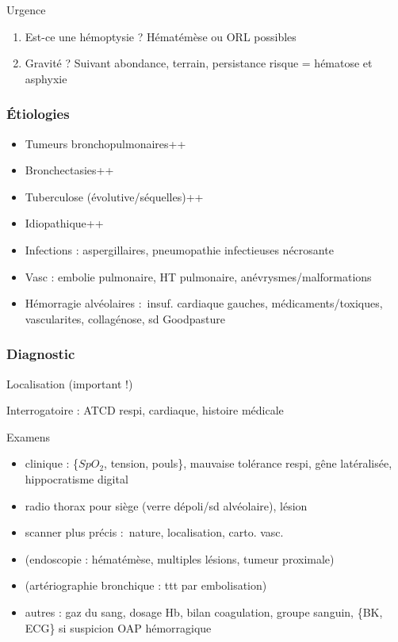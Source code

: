 \documentclass[11pt]{article}
\begin{document}
Urgence \faBomb

\begin{enumerate}
\item Est-ce une hémoptysie ? Hématémèse ou ORL possibles
\item Gravité ? Suivant abondance, terrain, persistance \thus risque = hématose et asphyxie
\end{enumerate}

\subsubsection{Étiologies}
\label{sec:orgc7c6ea9}

\begin{itemize}
\item Tumeurs bronchopulmonaires++
\item Bronchectasies++
\item Tuberculose (évolutive/séquelles)++
\item Idiopathique++
\item Infections : aspergillaires, pneumopathie infectieuses nécrosante
\item Vasc : embolie pulmonaire, HT pulmonaire, anévrysmes/malformations
\item Hémorragie alvéolaires : insuf. cardiaque gauches, médicaments/toxiques,
vascularites, collagénose, sd Goodpasture
\end{itemize}


\subsubsection{Diagnostic}
\label{sec:org1eb1626}
Localisation (important !)

Interrogatoire : ATCD respi, cardiaque, histoire médicale

Examens 

\begin{itemize}
\item clinique : \{\(SpO_2\), tension, pouls\}, mauvaise tolérance respi, gêne
latéralisée, hippocratisme digital
\item radio thorax pour siège (verre dépoli/sd alvéolaire), lésion
\item scanner plus précis : nature, localisation, carto. vasc.
\item (endoscopie : hématémèse, multiples lésions, tumeur proximale)
\item (artériographie bronchique : ttt par embolisation)
\item autres : gaz du sang, dosage Hb, bilan coagulation, groupe sanguin, \{BK,
ECG\} si suspicion OAP hémorragique
\end{itemize}
\end{document}
